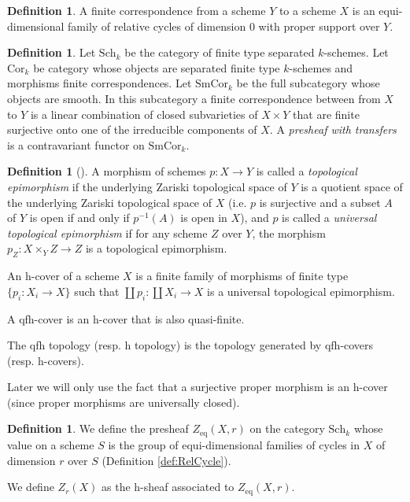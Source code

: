 \documentclass{amsart}
\theoremstyle{definition}
\newtheorem{defn}[theorem]{Definition}
\theoremstyle{remark}
\newcommand{\eq}{\text{eq}}
\begin{document}
\begin{defn}
A finite correspondence from a scheme $Y$ to a scheme $X$ is an equi-dimensional family of relative cycles of dimension $0$ with proper support over $Y$.
\end{defn}
\begin{defn}
Let $\text{Sch}_k$ be the category of finite type separated $k$-schemes.
Let $\text{Cor}_k$ be category whose objects are separated finite type $k$-schemes and morphisms finite correspondences.
Let $\text{SmCor}_k$ be the full subcategory whose objects are smooth.
In this subcategory a finite correspondence between from $X$ to  $Y$ is a linear combination of closed subvarieties of $X \times Y$ that are finite surjective onto one of the irreducible components of $X$.
A \emph{presheaf with transfers} is a contravariant functor on $\text{SmCor}_k$.
\end{defn}
\begin{defn}[{\cite[Section 4.1]{SV_Chow_Sheaves}}]
    A morphism of schemes $p:X\to Y$ is called a \emph{topological epimorphism} if the underlying Zariski topological space of $Y$ is a quotient space of the underlying Zariski topological space of $X$ (i.e. $p$ is surjective and a subset $A$ of $Y$ is open if and only if $p^{-1}(A)$ is open in $X$), and $p$ is called a \emph{universal topological epimorphism} if for any scheme $Z$ over $Y$, the morphism $p_Z : X \times_Y Z \to Z$ is a topological epimorphism.

An h-cover of a scheme $X$ is a finite family of morphisms of finite type $\{p_i : X_i \to X\}$ such that $\coprod p_i: \coprod X_i \to X$ is a universal topological epimorphism.

A qfh-cover is an h-cover that is also quasi-finite.

The qfh topology (resp. h topology) is the topology generated by qfh-covers (resp. h-covers).
\end{defn}


Later we will only use the fact that a surjective proper morphism is an h-cover (since proper morphisms are universally closed). 

\begin{defn}
We define the presheaf $Z_\eq(X, r)$ on the category $\text{Sch}_k$ whose value on  a scheme $S$ is the group of equi-dimensional families of cycles in $X$ of dimension $r$ over $S$ (Definition \ref{def:RelCycle}).

We define $Z_r(X)$ as the h-sheaf associated to $Z_\eq(X, r)$.
\end{defn}
\end{document}
